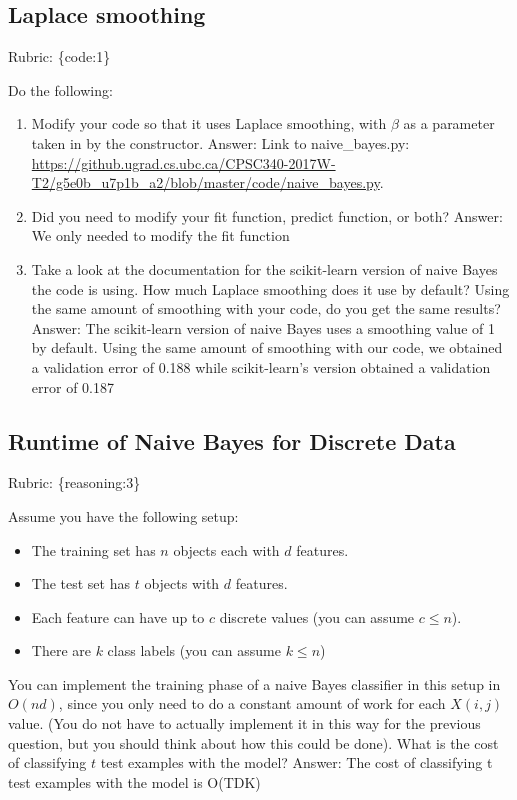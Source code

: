 \documentclass{article}
\def\blu#1{{\color{blu}#1}}
\def\gre#1{{\color{gre}#1}}
\def\items#1{\begin{itemize}#1\end{itemize}}
\def\enum#1{\begin{enumerate}#1\end{enumerate}}
\def\rubric#1{\gre{Rubric: \{#1\}}}{}
\begin{document}
\subsection{Laplace smoothing}
\rubric{code:1}

\blu{Do the following:}
\enum{
\item Modify your code so that it uses Laplace smoothing, with $\beta$
as a parameter taken in by the constructor.
\newline
\gre{Answer: Link to naive\_bayes.py: \url{https://github.ugrad.cs.ubc.ca/CPSC340-2017W-T2/g5e0b_u7p1b_a2/blob/master/code/naive_bayes.py}.}
\item Did you need to modify your fit function, predict function, or both?
\newline
\gre{Answer: We only needed to modify the fit function}
\item Take a look at the documentation for the scikit-learn version of naive Bayes the code is using. How much Laplace smoothing does it use by default? Using the same amount of smoothing with your code, do you get the same results?
\newline
\gre{Answer: The scikit-learn version of naive Bayes uses a smoothing value of 1 by default. Using the same amount of smoothing with our code, we obtained a validation error of 0.188 while scikit-learn's version obtained a validation error of 0.187}
}

\subsection{Runtime of Naive Bayes for Discrete Data}
\rubric{reasoning:3}

Assume you have the following setup:
\items{
\item The training set has $n$ objects each with $d$ features.
\item The test set has $t$ objects with $d$ features.
\item Each feature can have up to $c$ discrete values (you can assume $c \leq n$).
\item There are $k$ class labels (you can assume $k \leq n$)
}
You can implement the training phase of a naive Bayes classifier in this setup in $O(nd)$, since you only need to do a constant amount of work for each $X(i,j)$ value. (You do not have to actually implement it in this way for the previous question, but you should think about how this could be done). \blu{What is the cost of classifying $t$ test examples with the model?}
\newline
\gre{Answer: The cost of classifying t test examples with the model is O(TDK)}
\end{document}
